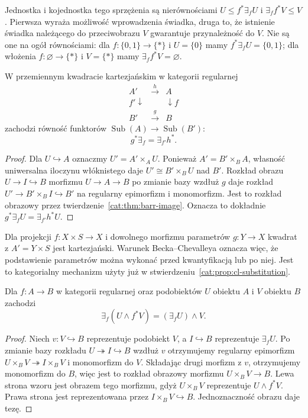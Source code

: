 Jednostka i kojednostka tego sprzężenia są nierównościami $U\leq f^*\exists_f U$ i $\exists_f f^*V\leq V$. Pierwsza wyraża możliwość wprowadzenia świadka, druga to, że istnienie świadka należącego do przeciwobrazu $V$ gwarantuje przynależność do $V$. Nie są one na ogół równościami: dla $f:\{0,1\}\to\{*\}$ i $U=\{0\}$ mamy $f^*\exists_f U=\{0,1\}$; dla włożenia $f:\varnothing\to\{*\}$ i $V=\{*\}$ mamy $\exists_f f^*V=\varnothing$.

\begin{twierdzenie}\label{cat:thm:cl-exists-beck-chevalley}
W przemiennym kwadracie kartezjańskim w kategorii regularnej
\[
\begin{array}{ccc}
 A'&\xrightarrow{h}&A\\
 {\scriptstyle f'}\downarrow&&\downarrow{\scriptstyle f}\\
 B'&\xrightarrow{g}&B
\end{array}
\]
zachodzi równość funktorów $\operatorname{Sub}(A)\to\operatorname{Sub}(B')$:
\[
 g^*\exists_f=\exists_{f'}h^*.
\]
\end{twierdzenie}
\begin{proof}
Dla $U\hookrightarrow A$ oznaczmy $U'=A'\times_A U$. Ponieważ $A'=B'\times_B A$, własność uniwersalna iloczynu włóknistego daje $U'\cong B'\times_B U$ nad $B'$. Rozkład obrazu $U\to I\hookrightarrow B$ morfizmu $U\to A\to B$ po zmianie bazy wzdłuż $g$ daje rozkład $U'\to B'\times_B I\hookrightarrow B'$ na regularny epimorfizm i monomorfizm. Jest to rozkład obrazowy przez twierdzenie~\ref{cat:thm:barr-image}. Oznacza to dokładnie $g^*\exists_f U=\exists_{f'}h^*U$.
\end{proof}

Dla projekcji $f:X\times S\to X$ i dowolnego morfizmu parametrów $g:Y\to X$ kwadrat z $A'=Y\times S$ jest kartezjański. Warunek Becka--Chevalleya oznacza więc, że podstawienie parametrów można wykonać przed kwantyfikacją lub po niej. Jest to kategorialny mechanizm użyty już w stwierdzeniu~\ref{cat:prop:cl-substitution}.

\begin{twierdzenie}\label{cat:thm:cl-frobenius}
Dla $f:A\to B$ w kategorii regularnej oraz podobiektów $U$ obiektu $A$ i $V$ obiektu $B$ zachodzi
\[
 \exists_f(U\wedge f^*V)=(\exists_f U)\wedge V.
\]
\end{twierdzenie}
\begin{proof}
Niech $v:V\hookrightarrow B$ reprezentuje podobiekt $V$, a $I\hookrightarrow B$ reprezentuje $\exists_f U$. Po zmianie bazy rozkładu $U\twoheadrightarrow I\hookrightarrow B$ wzdłuż $v$ otrzymujemy regularny epimorfizm $U\times_B V\twoheadrightarrow I\times_B V$ i monomorfizm do $V$. Składając drugi morfizm z $v$, otrzymujemy monomorfizm do $B$, więc jest to rozkład obrazowy morfizmu $U\times_B V\to B$. Lewa strona wzoru jest obrazem tego morfizmu, gdyż $U\times_B V$ reprezentuje $U\wedge f^*V$. Prawa strona jest reprezentowana przez $I\times_B V\hookrightarrow B$. Jednoznaczność obrazu daje tezę.
\end{proof}

